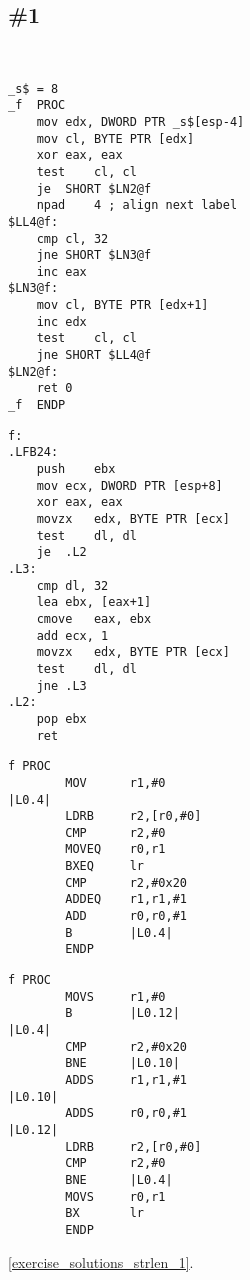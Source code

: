 \section{\Exercises}

\subsection{\Exercise \#1}
\label{exercise_strlen_1}

\WhatThisCodeDoes\

\begin{lstlisting}[caption=\Optimizing MSVC 2010]
_s$ = 8			
_f	PROC
	mov	edx, DWORD PTR _s$[esp-4]
	mov	cl, BYTE PTR [edx]
	xor	eax, eax
	test	cl, cl
	je	SHORT $LN2@f
	npad	4 ; align next label
$LL4@f:
	cmp	cl, 32	
	jne	SHORT $LN3@f
	inc	eax
$LN3@f:
	mov	cl, BYTE PTR [edx+1]
	inc	edx
	test	cl, cl
	jne	SHORT $LL4@f
$LN2@f:
	ret	0
_f	ENDP
\end{lstlisting}

\begin{lstlisting}[caption=GCC 4.8.1 -O3]
f:
.LFB24:
	push	ebx
	mov	ecx, DWORD PTR [esp+8]
	xor	eax, eax
	movzx	edx, BYTE PTR [ecx]
	test	dl, dl
	je	.L2
.L3:
	cmp	dl, 32
	lea	ebx, [eax+1]
	cmove	eax, ebx
	add	ecx, 1
	movzx	edx, BYTE PTR [ecx]
	test	dl, dl
	jne	.L3
.L2:
	pop	ebx
	ret
\end{lstlisting}

\begin{lstlisting}[caption=\OptimizingKeilVI (\ARMMode)]
f PROC
        MOV      r1,#0
|L0.4|
        LDRB     r2,[r0,#0]
        CMP      r2,#0
        MOVEQ    r0,r1
        BXEQ     lr
        CMP      r2,#0x20
        ADDEQ    r1,r1,#1
        ADD      r0,r0,#1
        B        |L0.4|
        ENDP
\end{lstlisting}

\begin{lstlisting}[caption=\OptimizingKeilVI (\ThumbMode)]
f PROC
        MOVS     r1,#0
        B        |L0.12|
|L0.4|
        CMP      r2,#0x20
        BNE      |L0.10|
        ADDS     r1,r1,#1
|L0.10|
        ADDS     r0,r0,#1
|L0.12|
        LDRB     r2,[r0,#0]
        CMP      r2,#0
        BNE      |L0.4|
        MOVS     r0,r1
        BX       lr
        ENDP
\end{lstlisting}

\Answer\: \ref{exercise_solutions_strlen_1}.
